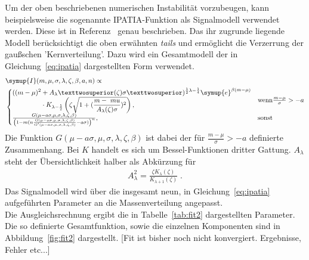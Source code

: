 %
Um der oben beschriebenen numerischen Instabilität vorzubeugen, kann beispielsweise die sogenannte IPATIA-Funktion als Signalmodell verwendet werden. Diese ist in Referenz~\cite{ipatia} genau beschrieben. Das ihr zugrunde liegende Modell berücksichtigt die oben erwähnten \textit{tails} und ermöglicht die Verzerrung der gaußschen 'Kernverteilung'. Dazu wird  ein Gesamtmodell der in Gleichung~\ref{eq:ipatia} dargestellten Form verwendet.
%
\begin{equation}
  \begin{split}
  &\symup{I}(m,\mu,\sigma,\lambda,\zeta,\beta,a,n)\propto\\
    &\begin{cases}
      \begin{split}
      ((m-\mu)^2&+A_\lambda²(\zeta)\sigma²)^{\frac{1}{2}\lambda-\frac{1}{4}}\symup{e}^{\beta(m-\mu)}\\
      &\cdot K_{\lambda-\frac{1}{2}}\left(\zeta\sqrt{1+(\frac{m-\ mu}{A_\lambda(\zeta)\sigma})^2}\right),
      \end{split} & \text{wenn} \frac{m-\mu}{\sigma}>-a \\
      \frac{G(\mu-a\sigma,\mu,\sigma,\lambda,\zeta,\beta)}{\left(1-m\/(n\frac{G(\mu-a\sigma,\mu,\sigma,\lambda,\zeta,\beta)}{G'(\mu-a\sigma,\mu,\sigma,\lambda,\zeta,\beta)}-a\sigma)\right)^n} ,& \text{sonst}
    \end{cases}
  \end{split}
  \label{eq:ipatia}
\end{equation}
%
Die Funktion $G(\mu-a\sigma,\mu,\sigma,\lambda,\zeta,\beta)$ ist dabei der für $\frac{m-\mu}{\sigma}>-a$ definierte Zusammenhang. Bei $K$
handelt es sich um Bessel-Funktionen dritter Gattung. $A_\lambda$ steht der Übersichtlichkeit halber als Abkürzung für
%
\begin{align*}
  A_\lambda^2=\frac{\zeta K_\lambda(\zeta)}{K_{\lambda+1}(\zeta)}\; .
\end{align*}
%
Das Signalmodell wird über die insgesamt neun, in Gleichung~\eqref{eq:ipatia} aufgeführten Parameter an die Massenverteilung angepasst.\\
Die Ausgleichsrechnung ergibt die in Tabelle~\ref{tab:fit2} dargestellten Parameter. Die so definierte Gesamtfunktion, sowie die einzelnen Komponenten sind in Abbildung~\ref{fig:fit2} dargestellt. [Fit ist bisher noch nicht konvergiert. Ergebnisse, Fehler etc...]
%

